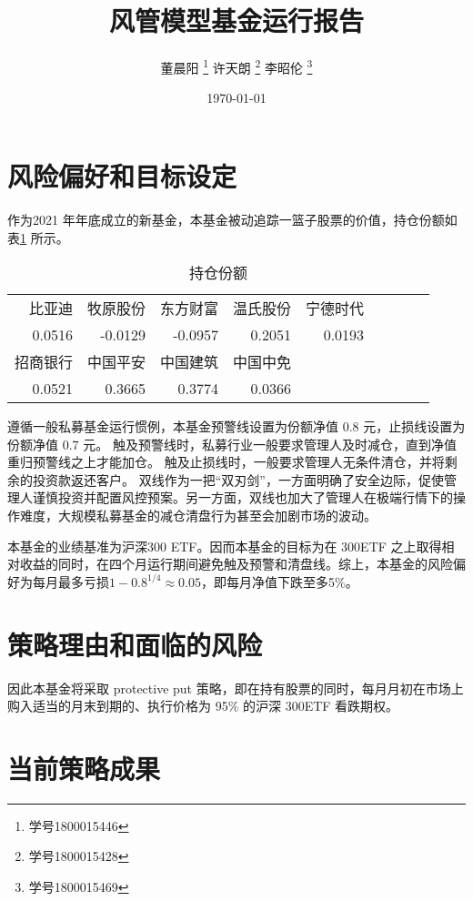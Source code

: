 \documentclass[a4paper,12pt]{ctexart}
\author{董晨阳 \thanks{学号1800015446} 许天朗 \thanks{学号1800015428} 李昭伦 \thanks{学号1800015469}}
\date{\today}
\title{风管模型基金运行报告}
\begin{document}
\maketitle
\tableofcontents
\section{风险偏好和目标设定}
作为2021 年年底成立的新基金，本基金被动追踪一篮子股票的价值，持仓份额如表\ref{holdings} 所示。
\begin{table}[ht]
	\begin{tabular}{rrrrrrrrr}
		比亚迪    & 牧原股份    & 东方财富    & 温氏股份   & 宁德时代   \\
		0.0516 & -0.0129 & -0.0957 & 0.2051 & 0.0193 \\
		招商银行   & 中国平安    & 中国建筑    & 中国中免            \\
		0.0521 & 0.3665  & 0.3774  & 0.0366          \\
	\end{tabular}
    \caption{持仓份额}
    \label{holdings}
\end{table}

遵循一般私募基金运行惯例，本基金预警线设置为份额净值 0.8 元，止损线设置为份额净值 0.7 元。
触及预警线时，私募行业一般要求管理人及时减仓，直到净值重归预警线之上才能加仓。
触及止损线时，一般要求管理人无条件清仓，并将剩余的投资款返还客户。
双线作为一把“双刃剑”，一方面明确了安全边际，促使管理人谨慎投资并配置风控预案。另一方面，双线也加大了管理人在极端行情下的操作难度，大规模私募基金的减仓清盘行为甚至会加剧市场的波动。

本基金的业绩基准为沪深300 ETF。因而本基金的目标为在 300ETF 之上取得相对收益的同时，在四个月运行期间避免触及预警和清盘线。综上，本基金的风险偏好为每月最多亏损\(1-0.8^{1/4}\approx 0.05\)，即每月净值下跌至多5\%。


\section{策略理由和面临的风险}
因此本基金将采取 protective put 策略，即在持有股票的同时，每月月初在市场上购入适当的月末到期的、执行价格为 95\% 的沪深 300ETF 看跌期权。
\section{当前策略成果}
\end{document}
